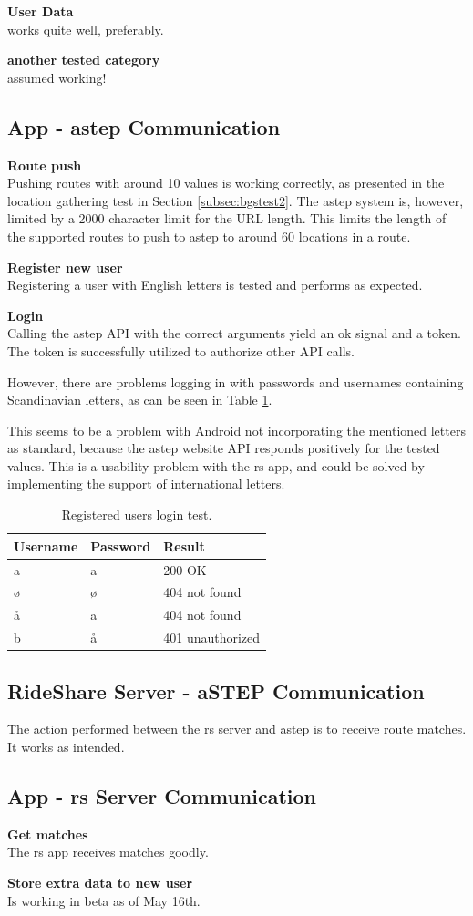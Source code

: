 \textbf{User Data}\\
works quite well, preferably.

\textbf{another tested category}\\
assumed working!


\subsection{App - \gls{astep} Communication}
\textbf{Route push}\\
Pushing routes with around 10 values is working correctly, as presented in the location gathering test in Section \ref{subsec:bgstest2}.
The \gls{astep} system is, however, limited by a 2000 character limit for the URL length.
This limits the length of the supported routes to push to \gls{astep} to around 60 locations in a route.

\textbf{Register new user}\\
Registering a user with English letters is tested and performs as expected.

\textbf{Login}\\
Calling the \gls{astep} API with the correct arguments yield an ok signal and a token.
The token is successfully utilized to authorize other API calls.

However, there are problems logging in with passwords and usernames containing Scandinavian letters, as can be seen in Table \ref{tab:logintest}.

This seems to be a problem with Android not incorporating the mentioned letters as standard, because the \gls{astep} website API responds positively for the tested values.
This is a usability problem with the \gls{rs} app, and could be solved by implementing the support of international letters.

\begin{table}[!ht]
	\centering
	\begin{tabular}{@{}lll@{}}
		Username & Password & Result \\
		\hline
		a & a & 200 OK\\
		ø & ø & 404 not found\\
		å & a & 404 not found\\
		b & å & 401 unauthorized\\
	\end{tabular}
	\caption{Registered users login test.}
	\label{tab:logintest}
\end{table}


\subsection{RideShare Server - aSTEP Communication}
The action performed between the \gls{rs} server and \gls{astep} is to receive route matches.
It works as intended.


\subsection{App - \gls{rs} Server Communication}
\textbf{Get matches}\\
The \gls{rs} app receives matches goodly.

\textbf{Store extra data to new user}\\
Is working in beta as of May 16th.
\fi
